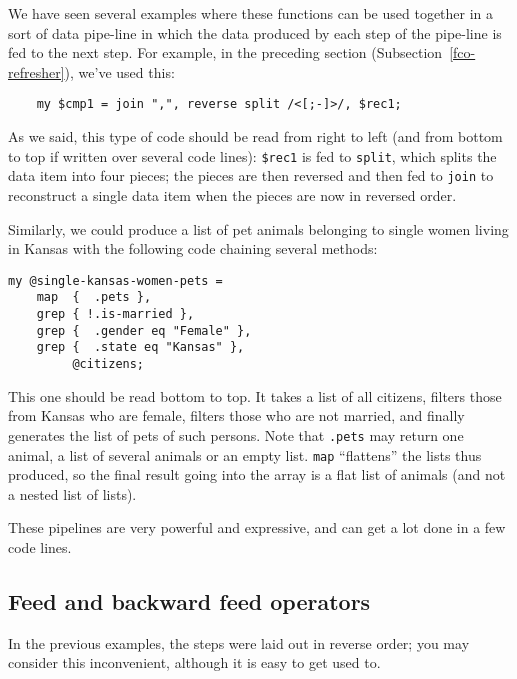 We have seen several examples where these functions can 
be used together in a sort of data pipe-line in which 
the data produced by each step of the pipe-line is fed 
to the next step. For example, in the preceding section 
(Subsection~\ref{fco-refresher}), we've used this:

\begin{verbatim}
    my $cmp1 = join ",", reverse split /<[;-]>/, $rec1;
\end{verbatim}
 
 
 

As we said, this type of code should be read from right 
to left (and from bottom to top if written over several 
code lines): \verb'$rec1' is fed to {\tt split}, which 
splits the data item into four pieces; the pieces are then 
reversed and then fed to {\tt join} to reconstruct a single 
data item when the pieces are now in reversed order.

Similarly, we could produce a list of pet animals belonging 
to single women living in Kansas with the following code 
chaining several methods:

\begin{verbatim}
my @single-kansas-women-pets =
    map  {  .pets },
    grep { !.is-married },
    grep {  .gender eq "Female" },
    grep {  .state eq "Kansas" },
         @citizens;
\end{verbatim}
 
 

This one should be read bottom to top. It takes a list 
of all citizens, filters those from Kansas who are female, 
filters those who are not married, and finally generates 
the list of pets of such persons. Note that \verb'.pets' 
may return one animal, a list of several animals or an 
empty list. \verb'map' ``flattens'' the lists thus produced, 
so the final result going into the array is a flat list of 
animals (and not a nested list of lists).

These pipelines are very powerful and expressive, and 
can get a lot done in a few code lines.

\subsection{Feed and backward feed operators}

In the previous examples, the steps were laid out in reverse 
order; you may consider this inconvenient, although it is 
easy to get used to.

